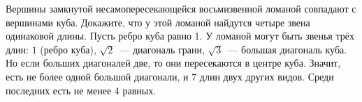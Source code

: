 \problem
Вершины замкнутой несамопересекающейся восьмизвенной ломаной совпадают с
вершинами куба.
Докажите, что у этой ломаной найдутся четыре звена одинаковой длины.
\solution
Пусть ребро куба равно 1.
У ломаной могут быть звенья трёх длин:
$1$ (ребро куба),
$\sqrt{2}$~--- диагональ грани,
$\sqrt{3}$~--- большая диагональ куба.
Но если больших диагоналей две, то они пересекаются в центре куба.
Значит, есть не более одной большой диагонали, и 7 длин двух других видов.
Среди последних есть не менее 4 равных.
\endproblem
